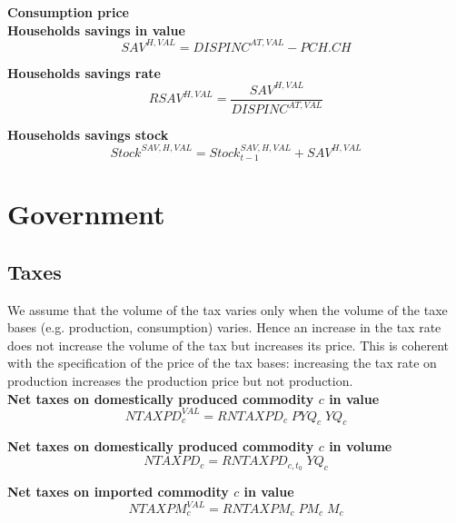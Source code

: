 \documentclass[12pt]{article}
\numberwithin{equation}{section}
\begin{document}
\noindent\textbf{Consumption price} \\


\noindent\textbf{Households savings in value} \\
\begin{dmath}
SAV^{H,VAL} = DISPINC^{AT,VAL} - PCH . CH
\end{dmath}

\noindent\textbf{Households savings rate} \\
\begin{dmath}
RSAV^{H,VAL} = \frac{SAV^{H,VAL}}{DISPINC^{AT,VAL}}
\end{dmath}

\noindent\textbf{Households savings stock} \\
\begin{dmath}
Stock^{SAV,H,VAL} = Stock^{SAV,H,VAL}_{t-1} + SAV^{H,VAL}
\end{dmath}


\section{Government}




\subsection{Taxes}



We assume that the volume of the tax varies only when the volume of the taxe bases (e.g. production, consumption) varies. Hence an increase in the tax rate does not increase the volume of the tax but increases its price. This is coherent with the specification of the price of the tax bases: increasing the tax rate on production increases the production price but not production. \\

\noindent\textbf{Net taxes on domestically produced commodity $c$ in value} \\
\begin{dmath}
NTAXPD^{VAL}_{c} = RNTAXPD_{c} \; PYQ_{c} \; YQ_{c}
\end{dmath}

\noindent\textbf{Net taxes on domestically produced commodity $c$ in volume} \\
\begin{dmath}
NTAXPD_{c} = RNTAXPD_{c, t_{0}} \; YQ_{c}
\end{dmath}

\noindent\textbf{Net taxes on imported commodity $c$ in value} \\
\begin{dmath}
NTAXPM^{VAL}_{c} = RNTAXPM_{c} \; PM_{c} \; M_{c}
\end{dmath}
\end{document}
